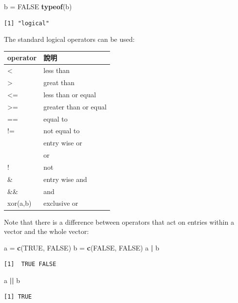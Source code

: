 \documentclass[]{book}
\newenvironment{Shaded}{\begin{snugshade}}{\end{snugshade}}
\newcommand{\KeywordTok}[1]{\textcolor[rgb]{0.13,0.29,0.53}{\textbf{#1}}}
\newcommand{\NormalTok}[1]{#1}
\newcommand{\OperatorTok}[1]{\textcolor[rgb]{0.81,0.36,0.00}{\textbf{#1}}}
\newcommand{\OtherTok}[1]{\textcolor[rgb]{0.56,0.35,0.01}{#1}}
\newcommand{\StringTok}[1]{\textcolor[rgb]{0.31,0.60,0.02}{#1}}
\theoremstyle{definition}
\theoremstyle{definition}
\theoremstyle{definition}
\theoremstyle{remark}
\begin{document}
\begin{Shaded}
\begin{Highlighting}[]
\NormalTok{b =}\StringTok{ }\OtherTok{FALSE}
\KeywordTok{typeof}\NormalTok{(b)}
\end{Highlighting}
\end{Shaded}

\begin{verbatim}
[1] "logical"
\end{verbatim}

The standard logical operators can be used:

\begin{longtable}[]{@{}ll@{}}
\toprule
operator & 說明\tabularnewline
\midrule
\endhead
\textless{} & less than\tabularnewline
\textgreater{} & great than\tabularnewline
\textless{}= & less than or equal\tabularnewline
\textgreater{}= & greater than or equal\tabularnewline
== & equal to\tabularnewline
!= & not equal to\tabularnewline
\textbar{} & entry wise or\tabularnewline
\textbar{}\textbar{} & or\tabularnewline
! & not\tabularnewline
\& & entry wise and\tabularnewline
\&\& & and\tabularnewline
xor(a,b) & exclusive or\tabularnewline
\bottomrule
\end{longtable}

Note that there is a difference between operators that act on entries
within a vector and the whole vector:

\begin{Shaded}
\begin{Highlighting}[]
\NormalTok{a =}\StringTok{ }\KeywordTok{c}\NormalTok{(}\OtherTok{TRUE}\NormalTok{, }\OtherTok{FALSE}\NormalTok{)}
\NormalTok{b =}\StringTok{ }\KeywordTok{c}\NormalTok{(}\OtherTok{FALSE}\NormalTok{, }\OtherTok{FALSE}\NormalTok{)}
\NormalTok{a }\OperatorTok{|}\StringTok{ }\NormalTok{b}
\end{Highlighting}
\end{Shaded}

\begin{verbatim}
[1]  TRUE FALSE
\end{verbatim}

\begin{Shaded}
\begin{Highlighting}[]
\NormalTok{a }\OperatorTok{||}\StringTok{ }\NormalTok{b}
\end{Highlighting}
\end{Shaded}

\begin{verbatim}
[1] TRUE
\end{verbatim}
\end{document}
